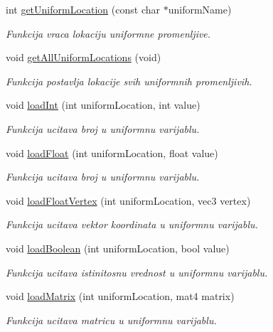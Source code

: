 \begin{DoxyCompactItemize}
int \hyperlink{classshader_1_1TerrainShader_a69db3dcab0c9d49d9d57ef1121dc7763}{get\+Uniform\+Location} (const char $\ast$uniform\+Name)
\begin{DoxyCompactList}\small\item\em Funkcija vraca lokaciju uniformne promenljive. \end{DoxyCompactList}\item 
void \hyperlink{classshader_1_1TerrainShader_ad1a4ef8d420ef0a4d7840a12912ddbfe}{get\+All\+Uniform\+Locations} (void)
\begin{DoxyCompactList}\small\item\em Funkcija postavlja lokacije svih uniformnih promenljivih. \end{DoxyCompactList}\item 
void \hyperlink{classshader_1_1TerrainShader_ae4ccafdcc22f15cdbc104d416decd294}{load\+Int} (int uniform\+Location, int value)
\begin{DoxyCompactList}\small\item\em Funkcija ucitava broj u uniformnu varijablu. \end{DoxyCompactList}\item 
void \hyperlink{classshader_1_1TerrainShader_a9d4a75f7aa0ab0834dbef2d147919c47}{load\+Float} (int uniform\+Location, float value)
\begin{DoxyCompactList}\small\item\em Funkcija ucitava broj u uniformnu varijablu. \end{DoxyCompactList}\item 
void \hyperlink{classshader_1_1TerrainShader_aa980b906e1d8b02a1427fea028750e14}{load\+Float\+Vertex} (int uniform\+Location, vec3 vertex)
\begin{DoxyCompactList}\small\item\em Funkcija ucitava vektor koordinata u uniformnu varijablu. \end{DoxyCompactList}\item 
void \hyperlink{classshader_1_1TerrainShader_adba13f15120aff8a5015955afed332b2}{load\+Boolean} (int uniform\+Location, bool value)
\begin{DoxyCompactList}\small\item\em Funkcija ucitava istinitosnu vrednost u uniformnu varijablu. \end{DoxyCompactList}\item 
void \hyperlink{classshader_1_1TerrainShader_a855daf1b36bc119a554caf0465c52400}{load\+Matrix} (int uniform\+Location, mat4 matrix)
\begin{DoxyCompactList}\small\item\em Funkcija ucitava matricu u uniformnu varijablu. \end{DoxyCompactList}\item 

\end{DoxyCompactItemize}
